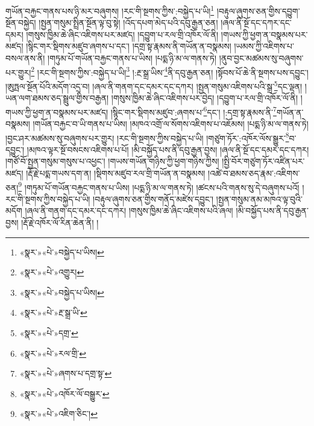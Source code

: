 གཡོན་བརྐྱང་གནས་པས་ཉི་མར་བཞུགས། །རང་གི་སྔགས་ཀྱིས་:བསྐྱེད་པ་ཡི།\footnote{«སྣར་»«པེ་»བསྐྱེད་པ་ཡིས།} །བརྟུལ་ཞུགས་ཅན་གྱིས་དབྱུག་སྔོན་བསྐྱེད། །སྤྱན་གསུམ་སྤྲིན་སྔོན་ལྟ་བུ་སྟེ། །འོད་དཔག་མེད་པའི་དབུ་རྒྱན་ཅན། །ཞལ་ནི་སྔོ་དང་དཀར་དང་དམར། །གསུས་ཁྱིམ་ཆེ་ཞིང་འཇིགས་པར་མཛད། །དབྱུག་པ་རལ་གྲི་འཁོར་ལོ་ནི། །གཡས་ཀྱི་ཕྱག་ན་བསྣམས་པར་མཛད། །སྙིང་གར་སྡིགས་མཛུབ་ཞགས་པ་དང་། །དགྲ་སྟ་རྣམས་ནི་གཡོན་ན་བསྣམས། །ཡམས་ཀྱི་འཇིགས་པ་བསལ་ནས་ནི། །གཏུམ་པོ་གཡོན་བརྐྱང་གནས་པ་ཡིས། །པདྨ་ཉི་མ་ལ་གནས་ཏེ། །ནུབ་བྱང་མཚམས་སུ་བཞུགས་པར་གྱུར།\footnote{«སྣར་»«པེ་»འགྱུར།} །རང་གི་སྔགས་ཀྱིས་:བསྐྱེད་པ་ཡི།\footnote{«སྣར་»«པེ་»བསྐྱེད་པ་ཡིས།} །:རྔ་སྒྲ་ཡིས་\footnote{«སྣར་»«པེ་»རྔ་སྒྲ་ཡི་}ནི་དབུ་རྒྱན་ཅན། །སྟོབས་པོ་ཆེ་ནི་སྔགས་པས་དབྱུང་། །ཨུཏྤལ་སྔོན་པོའི་མདོག་འདྲ་བ། །ཞལ་ནི་གནག་དང་དམར་དང་དཀར། །སྤྱན་གསུམ་འཇིགས་པའི་སྒྲ་\footnote{«སྣར་»«པེ་»དགྲ་}དང་ལྡན། །ཡན་ལག་ཐམས་ཅད་སྦྲུལ་གྱིས་བརྒྱན། །གསུས་ཁྱིམ་ཆེ་ཞིང་འཇིགས་པར་བྱེད། །དབྱུག་པ་རལ་གྲི་འཁོར་ལོ་ནི། །གཡས་ཀྱི་ཕྱག་ན་བསྣམས་པར་མཛད། །སྙིང་གར་སྡིགས་མཛུབ་:ཞགས་པ་\footnote{«སྣར་»«པེ་»རལ་གྲི་}དང་། །:དགྲ་སྟ་རྣམས་ནི་\footnote{«སྣར་»«པེ་»ཞགས་པ་དགྲ་སྟ་}གཡོན་ན་བསྣམས། །གཡོན་བརྐྱང་བ་ཡི་གནས་པ་ཡིས། །མཁའ་འགྲོ་ལ་སོགས་འཇིགས་པ་འཇོམས། །པདྨ་ཉི་མ་ལ་གནས་ཏེ། །བྱང་ཤར་མཚམས་སུ་བཞུགས་པར་གྱུར། །རང་གི་སྔགས་ཀྱིས་བསྐྱེད་པ་ཡི། །གཙུག་ཏོར་:འཁོར་ལོས་སྒྱུར་\footnote{«སྣར་»«པེ་»འཁོར་ལོ་བསྒྱུར་}བ་དབྱུང་། །མཁའ་ལྟར་སྔོ་བསངས་འཇིགས་པ་པོ། །མི་བསྐྱོད་པས་ནི་དབུ་རྒྱན་བྱས། །ཞལ་ནི་སྔོ་དང་དམར་དང་དཀར། །གཙོ་བོ་སྤྱན་གསུམ་གསུས་པ་འཕྱང་། །གཡས་གཡོན་གཉིས་ཀྱི་ཕྱག་གཉིས་ཀྱིས། །སྤྱི་བོར་གཙུག་ཏོར་འཛིན་པར་མཛད། །རྡོ་རྗེ་པདྨ་གཡས་དག་ན། །སྡིགས་མཛུབ་རལ་གྲི་གཡོན་ན་བསྣམས། །འཚེ་བ་ཐམས་ཅད་རྣམ་:འཇིགས་ཅན།\footnote{«སྣར་»«པེ་»འཇིག་ཅིང་།} །གཏུམ་པོ་གཡོན་བརྐྱང་གནས་པ་ཡིས། །པདྨ་ཉི་མ་ལ་གནས་ཏེ། །ཚངས་པའི་གནས་སུ་དེ་བཞུགས་པའོ། །རང་གི་སྔགས་ཀྱིས་བསྐྱེད་པ་ཡི། །བརྟུལ་ཞུགས་ཅན་གྱིས་གནོད་མཛེས་དབྱུང་། །སྤྱན་གསུམ་ནམ་མཁའ་ལྟ་བུའི་མདོག །ཞལ་ནི་གནག་དང་དམར་དང་དཀར། །གསུས་ཁྱིམ་ཆེ་ཞིང་འཇིགས་པའི་ཞལ། །མི་བསྐྱོད་པས་ནི་དབུ་རྒྱན་བྱས། །རྡོ་རྗེ་འཁོར་ལོ་རིན་ཆེན་ནི། །
